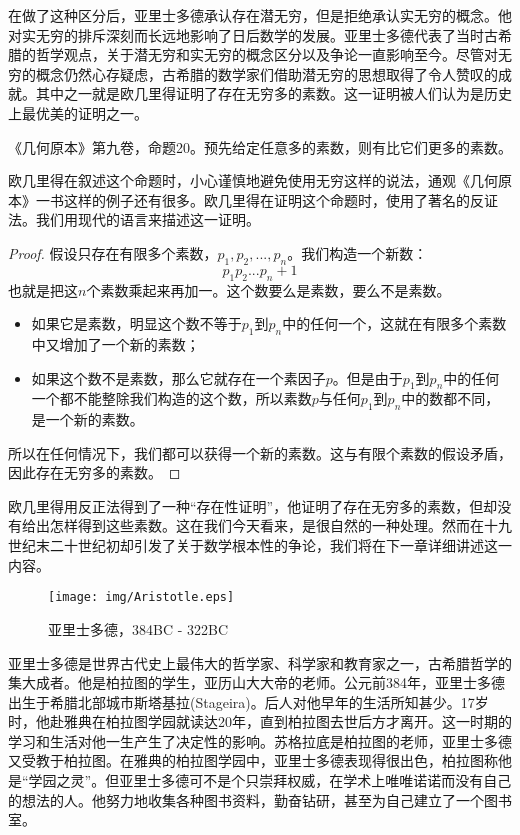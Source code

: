 \documentclass{article}
\begin{document}
在做了这种区分后，亚里士多德承认存在潜无穷，但是拒绝承认实无穷的概念。他对实无穷的排斥深刻而长远地影响了日后数学的发展\cite{HanXueTao16}。亚里士多德代表了当时古希腊的哲学观点，关于潜无穷和实无穷的概念区分以及争论一直影响至今。尽管对无穷的概念仍然心存疑虑，古希腊的数学家们借助潜无穷的思想取得了令人赞叹的成就。其中之一就是欧几里得证明了存在无穷多的素数。这一证明被人们认为是历史上最优美的证明之一。

\begin{theorem}
《几何原本》第九卷，命题20。预先给定任意多的素数，则有比它们更多的素数\cite{Elements}。
\end{theorem}

欧几里得在叙述这个命题时，小心谨慎地避免使用无穷这样的说法，通观《几何原本》一书这样的例子还有很多。欧几里得在证明这个命题时，使用了著名的反证法。我们用现代的语言来描述这一证明。

\begin{proof}
假设只存在有限多个素数，$p_1, p_2, ..., p_n$。我们构造一个新数：
\[
p_1 p_2 ... p_n + 1
\]
也就是把这$n$个素数乘起来再加一。这个数要么是素数，要么不是素数。

\begin{itemize}
\item 如果它是素数，明显这个数不等于$p_1$到$p_n$中的任何一个，这就在有限多个素数中又增加了一个新的素数；
\item 如果这个数不是素数，那么它就存在一个素因子$p$。但是由于$p_1$到$p_n$中的任何一个都不能整除我们构造的这个数，所以素数$p$与任何$p_1$到$p_n$中的数都不同，是一个新的素数。
\end{itemize}
所以在任何情况下，我们都可以获得一个新的素数。这与有限个素数的假设矛盾，因此存在无穷多的素数。
\end{proof}

欧几里得用反正法得到了一种“存在性证明”，他证明了存在无穷多的素数，但却没有给出怎样得到这些素数。这在我们今天看来，是很自然的一种处理。然而在十九世纪末二十世纪初却引发了关于数学根本性的争论，我们将在下一章详细讲述这一内容。

\begin{wrapfigure}{L}{0.3\textwidth}
 \centering
 \texttt{[image: img/Aristotle.eps]}
 \captionsetup{labelformat=empty}
 \caption{亚里士多德，384BC - 322BC}
 \label{fig:Aristotle}
\end{wrapfigure}

亚里士多德是世界古代史上最伟大的哲学家、科学家和教育家之一，古希腊哲学的集大成者。他是柏拉图的学生，亚历山大大帝的老师。公元前384年，亚里士多德出生于希腊北部城市斯塔基拉(Stageira)。后人对他早年的生活所知甚少。17岁时，他赴雅典在柏拉图学园就读达20年，直到柏拉图去世后方才离开。这一时期的学习和生活对他一生产生了决定性的影响。苏格拉底是柏拉图的老师，亚里士多德又受教于柏拉图。在雅典的柏拉图学园中，亚里士多德表现得很出色，柏拉图称他是“学园之灵”。但亚里士多德可不是个只崇拜权威，在学术上唯唯诺诺而没有自己的想法的人。他努力地收集各种图书资料，勤奋钻研，甚至为自己建立了一个图书室。
\end{document}
